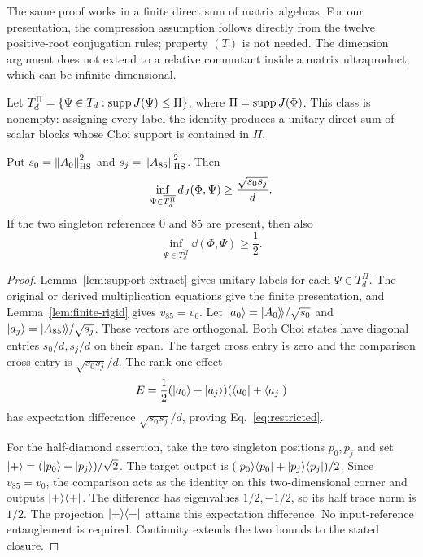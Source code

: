 The same proof works in a finite direct sum of matrix algebras. For our presentation, the
compression assumption follows directly from the twelve positive-root conjugation rules;
property $(T)$ is not needed. The dimension argument does not extend to a relative commutant
inside a matrix ultraproduct, which can be infinite-dimensional.

Let $T_d^\Pi=\{\Psi\in T_d:\operatorname{supp} J(\Psi)\le\Pi\}$, where $\Pi=\operatorname{supp} J(\Phi)$.
This class is nonempty: assigning every label the identity produces a unitary direct sum
of scalar blocks whose Choi support is contained in $\Pi$.

\begin{theorem}\label{thm:restricted}
Put $s_0=\left\lVert A_0\right\rVert_{\mathrm{HS}}^2$ and $s_j=\left\lVert A_{85}\right\rVert_{\mathrm{HS}}^2$. Then
\begin{equation}
 \inf_{\Psi\in\overline{T_d^\Pi}}d_J(\Phi,\Psi)\ge\frac{\sqrt{s_0s_j}}{d}.
 \label{eq:restricted}
\end{equation}
If the two singleton references 0 and 85 are present, then also
\begin{equation}
 \inf_{\Psi\in\overline{T_d^\Pi}}\dd(\Phi,\Psi)\ge\frac12.
 \label{eq:restricted-half-diamond}
\end{equation}
\end{theorem}
\begin{proof}
Lemma~\ref{lem:support-extract} gives unitary labels for each $\Psi\in T_d^\Pi$.
The original or derived multiplication equations give the finite presentation, and
Lemma~\ref{lem:finite-rigid} gives $v_{85}=v_0$. Let
$\lvert a_0\rangle=\lvert A_0\rangle\!\rangle/\sqrt{s_0}$ and $\lvert a_j\rangle=\lvert A_{85}\rangle\!\rangle/\sqrt{s_j}$.
These vectors are orthogonal. Both Choi states have diagonal entries $s_0/d,s_j/d$ on
their span. The target cross entry is zero and the comparison cross entry is
$\sqrt{s_0s_j}/d$. The rank-one effect
\[
 E=\frac12(\lvert a_0\rangle+\lvert a_j\rangle)(\langle a_0\rvert+\langle a_j\rvert)
\]
has expectation difference $\sqrt{s_0s_j}/d$, proving Eq.~\eqref{eq:restricted}.

For the half-diamond assertion, take the two singleton positions $p_0,p_j$ and set
$\lvert +\rangle=(\lvert p_0\rangle+\lvert p_j\rangle)/\sqrt2$. The target output is
$(\lvert p_0\rangle\langle p_0\rvert+\lvert p_j\rangle\langle p_j\rvert)/2$. Since $v_{85}=v_0$, the comparison
acts as the identity on this two-dimensional corner and outputs $\lvert +\rangle\langle +\rvert$.
The difference has eigenvalues $1/2,-1/2$, so its half trace norm is $1/2$.
The projection $\lvert +\rangle\langle +\rvert$ attains this expectation difference. No input-reference
entanglement is required. Continuity extends the two bounds to the stated closure.
\end{proof}

